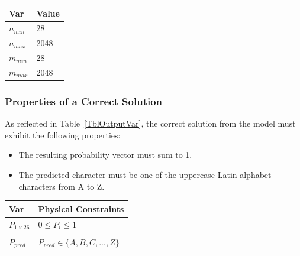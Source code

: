 \documentclass[12pt]{article}
\begin{document}
\begin{table}[!h]
\caption{Specification Parameter Values} \label{TblSpecParams}
\renewcommand{\arraystretch}{1.2}
\noindent \begin{longtable*}{l l} 
  \toprule
  \textbf{Var} & \textbf{Value} \\
  \midrule 
  $n_{min}$ & 28 \\
  $n_{max}$ & 2048 \\
  $m_{min}$ & 28 \\
  $m_{max}$ & 2048 \\
  \bottomrule
\end{longtable*}
\end{table}

\subsubsection{Properties of a Correct Solution} \label{sec_CorrectSolution}

\noindent
As reflected in Table~\ref{TblOutputVar}, the correct solution from the model
must exhibit the following properties:

\begin{itemize}
  \item The resulting probability vector must sum to 1.
  \item The predicted character must be one of the uppercase Latin alphabet
  characters from A to Z. 
\end{itemize}


\begin{table}[!h]
\caption{Output Variables} \label{TblOutputVar}
\renewcommand{\arraystretch}{1.2}
\noindent \begin{longtable*}{l l} 
  \toprule
  \textbf{Var} & \textbf{Physical Constraints} \\
  \midrule 
  $P_{1 \times 26}$ & $0 \leq P_i \leq 1$ \\
  \\
  $P_{pred}$ & $P_{pred} \in \{A, B, C, ..., Z\}$ \\
  \bottomrule
\end{longtable*}
\end{table}
\end{document}
